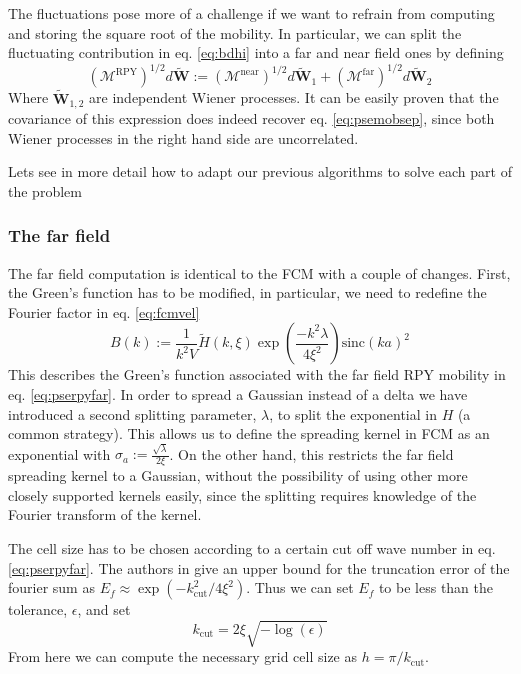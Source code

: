 \documentclass[ twoside,openright,titlepage,numbers=noenddot,%
headinclude,footinclude,cleardoublepage=empty,abstract=on,
BCOR=5mm,paper=a4,fontsize=11pt, dvipsnames
]{scrreprt}
\renewcommand{\vec}[1]{\bm{#1}}
\newcommand{\tens}[1]{\bm{\mathcal{#1}}}
\newcommand{\sinc}{\textrm{sinc}}
\newcommand{\near}{\textrm{near}}
\newcommand{\far}{\textrm{far}}
\newcommand{\noise}{\widetilde{W}}
\begin{document}
The fluctuations pose more of a challenge if we want to refrain from computing and storing the square root of the mobility. In particular, we can split the fluctuating contribution in eq. \eqref{eq:bdhi} into a far and near field ones by defining
\begin{equation}
  \label{eq:psenoise}
  (\tens{M}^{\textrm{RPY}})^{1/2} d\vec{\noise} :=  (\tens{M}^{\near})^{1/2} d\vec{\noise}_1 + (\tens{M}^{\far})^{1/2} d\vec{\noise}_2
\end{equation}
Where $\vec{\noise}_{1,2}$ are independent Wiener processes. It can be easily proven that the covariance of this expression does indeed recover eq. \eqref{eq:psemobsep}, since both Wiener processes in the right hand side are uncorrelated.

Lets see in more detail how to adapt our previous algorithms to solve each part of the problem

\subsubsection*{The far field}

The far field computation is identical to the \gls{FCM} with a couple of changes.
First, the Green's function has to be modified, in particular, we need to redefine the Fourier factor in eq. \eqref{eq:fcmvel}
\begin{equation}
  B(k) := \frac{1}{k^2V}\tilde{H}(k,\xi)\exp\left(\frac{-k^2\lambda}{4\xi^2}\right)\sinc(ka)^2
\end{equation}
This describes the Green's function associated with the far field \gls{RPY} mobility in eq. \eqref{eq:pserpyfar}. In order to spread a Gaussian instead of a delta we have introduced a second splitting parameter, $\lambda$, to split the exponential in $H$ (a common strategy\cite{Lindbo2011}\cite{Wang2016}). This allows us to define the spreading kernel in \gls{FCM} as an exponential with $\sigma_a := \frac{\sqrt{\lambda}}{2\xi}$. On the other hand, this restricts the far field spreading kernel to a Gaussian, without the possibility of using other more closely supported kernels easily, since the splitting requires knowledge of the Fourier transform of the kernel.

The cell size has to be chosen according to a certain cut off wave number in eq. \eqref{eq:pserpyfar}. The authors in \cite{Lindbo2010} give an upper bound for the truncation error of the fourier sum as $E_f \approx \exp(-k_{\textrm{cut}}^2/4\xi^2)$. Thus we can set $E_f$ to be less than the tolerance, $\epsilon$, and set
\begin{equation}
  k_{\textrm{cut}} = 2\xi\sqrt{-\log(\epsilon)}
\end{equation}
From here we can compute the necessary grid cell size as $h = \pi/k_{\textrm{cut}}$.
\end{document}
